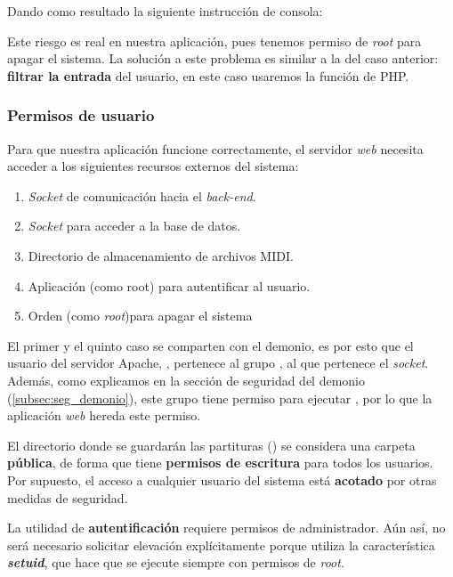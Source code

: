 Dando como resultado la siguiente instrucción de consola:

\begin{center}
\end{center}

Este riesgo es real en nuestra aplicación, pues tenemos permiso de \textit{root} para apagar el sistema. La solución a este problema es similar a la del caso anterior: \textbf{filtrar la entrada} del usuario, en este caso usaremos la función  de PHP.

\subsubsection{Permisos de usuario}

Para que nuestra aplicación funcione correctamente, el servidor \textit{web} necesita acceder a los siguientes recursos externos del sistema:

\begin{enumerate}
	\item \textit{Socket} de comunicación hacia el \textit{back-end}.
	\item \textit{Socket} para acceder a la base de datos.
	\item Directorio de almacenamiento de archivos \acrshort{MIDI}.
	\item Aplicación  (como root) para autentificar al usuario.
	\item Orden  (como \textit{root})para apagar el sistema
\end{enumerate}

El primer y el quinto caso se comparten con el demonio, es por esto que el usuario del servidor Apache, , pertenece al grupo , al que pertenece el \textit{socket}. Además, como explicamos en la sección de seguridad del demonio (\ref{subsec:seg_demonio}), este grupo tiene permiso para ejecutar , por lo que la aplicación \textit{web} hereda este permiso.

El directorio donde se guardarán las partituras () se considera una carpeta \textbf{pública}, de forma que tiene \textbf{permisos de escritura} para todos los usuarios. Por supuesto, el acceso a cualquier usuario del sistema está \textbf{acotado} por otras medidas de seguridad.

La utilidad de \textbf{autentificación} requiere permisos de administrador. Aún así, no será necesario solicitar elevación explícitamente porque utiliza la característica \textbf{\textit{setuid}}, que hace que se ejecute siempre con permisos de \textit{root}.

